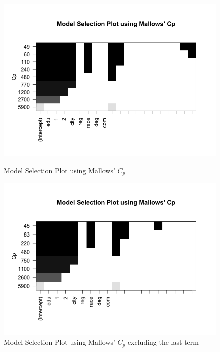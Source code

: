 \documentclass{article}
\begin{document}
      \begin{figure}
        \centering
        \begin{minipage}{.45\textwidth}
          \centering
          \includegraphics[scale=0.35]{selection/modelselect1}
          \caption{Model Selection Plot using Mallows' $C_p$}
          \label{fig:modelselect1}
        \end{minipage}
        \begin{minipage}{.45\textwidth}
          \centering
          \includegraphics[scale=0.35]{selection/modelselect2}
          \caption{Model Selection Plot using Mallows' $C_p$ excluding the last term}
          \label{fig:modelselect2}
        \end{minipage}
      \end{figure}
\end{document}
